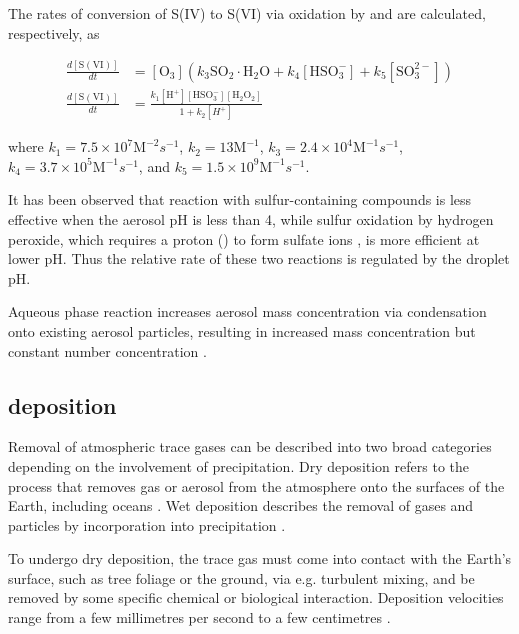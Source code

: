 The rates of conversion of S(IV) to S(VI) via oxidation by  and  are calculated, respectively, as

\begin{align}
    \frac{d[\mathrm{S(VI)}]}{dt} & = [\mathrm{O_3}]( k_3 \mathrm{SO_2 \cdot H_2O} + k_4 [\mathrm{HSO_3^-}] + k_5 [\mathrm{SO_3^{2-}}]) \label{ch1:eq:so2-o3} \\
    \frac{d[\mathrm{S(VI)}]}{dt} & = \frac{k_1 \mathrm{[H^+][HSO_3^-][H_2O_2]}}{1+k_2[H^+]} \label{ch1:eq:so2-h2o2}
\end{align}

where 
$k_1 = 7.5 \times 10^7 \mathrm{M}^{-2}s^{-1}$,
$k_2 = 13 \mathrm{M}^{-1}$,
$k_3 = 2.4 \times 10^4 \mathrm{M}^{-1}s^{-1}$,
$k_4 = 3.7 \times 10^5 \mathrm{M}^{-1}s^{-1}$, and
$k_5 = 1.5 \times 10^9 \mathrm{M}^{-1}s^{-1}$. 

It has been observed that  reaction with sulfur-containing compounds is less effective when the aerosol pH is less than 4, while sulfur oxidation by hydrogen peroxide, which requires a proton () to form sulfate ions \citep{seinfeldAtmosphericChemistryPhysics2016}, is more efficient at lower pH. Thus the relative rate of these two reactions is regulated by the droplet pH. 

Aqueous phase reaction increases aerosol mass concentration via condensation onto existing aerosol particles, resulting in increased mass concentration but constant number concentration \citep{seinfeldAtmosphericChemistryPhysics2016}.


\subsection{ deposition}

Removal of atmospheric trace gases can be described into two broad categories depending on the involvement of precipitation. Dry deposition refers to the process that removes gas or aerosol from the atmosphere onto the surfaces of the Earth, including oceans \citep{dewysAssessmentFateSulfur1978}.  Wet deposition describes the removal of gases and particles by incorporation into precipitation \citep{wayneChemistryAtmospheresIntroduction2006}. 

To undergo dry deposition, the trace gas must come into contact with the Earth's surface, such as tree foliage or the ground, via e.g. turbulent mixing, and be removed by some specific chemical or biological interaction.  Deposition velocities range from a few millimetres per second to a few centimetres \citep[e.g.][]{smithAirborneTransportSulphur1975, hardacreEvaluationSO2SO422021, mulcahyUKESM1DevelopmentEvaluation2022}.

